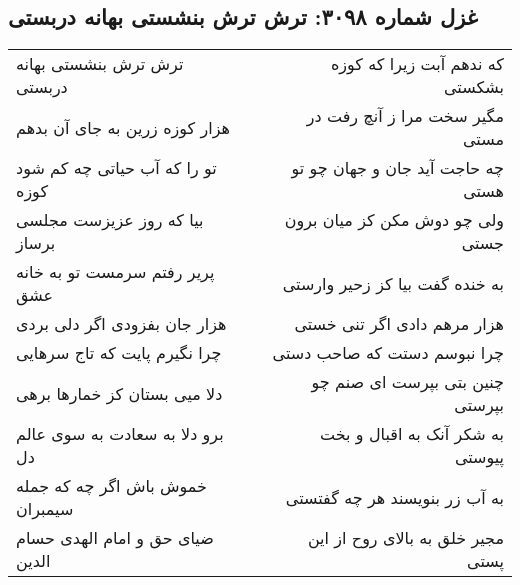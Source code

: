 \begin{center}
\section*{غزل شماره ۳۰۹۸: ترش ترش بنشستی بهانه دربستی}
\label{sec:3098}
\begin{longtable}{l p{0.5cm} r}
ترش ترش بنشستی بهانه دربستی
&&
که ندهم آبت زیرا که کوزه بشکستی
\\
هزار کوزه زرین به جای آن بدهم
&&
مگیر سخت مرا ز آنچ رفت در مستی
\\
تو را که آب حیاتی چه کم شود کوزه
&&
چه حاجت آید جان و جهان چو تو هستی
\\
بیا که روز عزیزست مجلسی برساز
&&
ولی چو دوش مکن کز میان برون جستی
\\
پریر رفتم سرمست تو به خانه عشق
&&
به خنده گفت بیا کز زحیر وارستی
\\
هزار جان بفزودی اگر دلی بردی
&&
هزار مرهم دادی اگر تنی خستی
\\
چرا نگیرم پایت که تاج سرهایی
&&
چرا نبوسم دستت که صاحب دستی
\\
دلا میی بستان کز خمارها برهی
&&
چنین بتی بپرست ای صنم چو بپرستی
\\
برو دلا به سعادت به سوی عالم دل
&&
به شکر آنک به اقبال و بخت پیوستی
\\
خموش باش اگر چه که جمله سیمبران
&&
به آب زر بنویسند هر چه گفتستی
\\
ضیای حق و امام الهدی حسام الدین
&&
مجیر خلق به بالای روح از این پستی
\\
\end{longtable}
\end{center}
